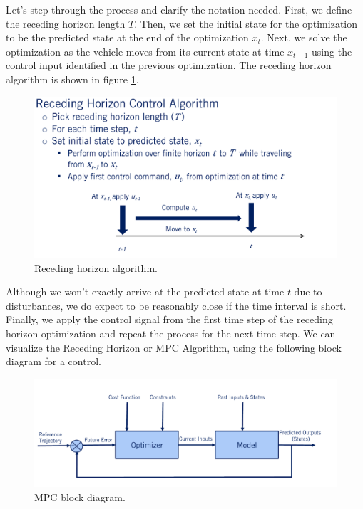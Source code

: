 Let's step through the process
and clarify the notation needed. First, we define the receding
horizon length $T$. Then, we set the initial state for the optimization to be
the predicted state at the end of the optimization $x_t$. Next, we solve the optimization
as the vehicle moves from its current
state at time $x_{t-1}$ using the control input identified
in the previous optimization. The receding horizon algorithm is shown in figure \ref{mpc_1}.

\begin{figure}[!htb]
\begin{center}
\includegraphics[scale=0.280]{img/lateral_control/mpc_1.jpeg}
\end{center}
\caption{Receding horizon algorithm.}
\label{mpc_1}
\end{figure}

Although we won't exactly arrive at the predicted state at
time $t$ due to disturbances, we do expect to be reasonably close
if the time interval is short. Finally, we apply the control
signal from the first time step of the receding horizon optimization and repeat the process
for the next time step. We can visualize the Receding
Horizon or MPC Algorithm, using the following block
diagram for a control. 

\begin{figure}[!htb]
\begin{center}
\includegraphics[scale=0.280]{img/lateral_control/mpc_2.jpeg}
\end{center}
\caption{MPC block diagram.}
\label{mpc_2}
\end{figure}

